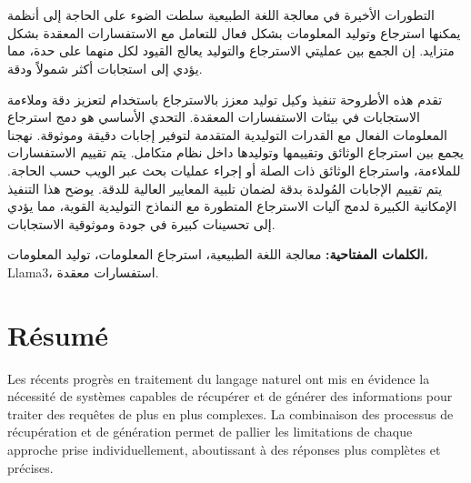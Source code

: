 
\chapter*{}

\begin{RLtext}
    التطورات الأخيرة في معالجة اللغة الطبيعية سلطت الضوء على الحاجة إلى أنظمة يمكنها استرجاع وتوليد المعلومات بشكل فعال للتعامل مع الاستفسارات المعقدة بشكل متزايد. إن الجمع بين عمليتي الاسترجاع والتوليد يعالج القيود لكل منهما على حدة، مما يؤدي إلى استجابات أكثر شمولاً ودقة.

    \hfill

    تقدم هذه الأطروحة تنفيذ وكيل توليد معزز بالاسترجاع  باستخدام  لتعزيز دقة وملاءمة الاستجابات في بيئات الاستفسارات المعقدة. التحدي الأساسي هو دمج استرجاع المعلومات الفعال مع القدرات التوليدية المتقدمة لتوفير إجابات دقيقة وموثوقة. نهجنا يجمع بين استرجاع الوثائق وتقييمها وتوليدها داخل نظام متكامل. يتم تقييم الاستفسارات للملاءمة، واسترجاع الوثائق ذات الصلة أو إجراء عمليات بحث عبر الويب حسب الحاجة. يتم تقييم الإجابات المُولدة بدقة لضمان تلبية المعايير العالية للدقة. يوضح هذا التنفيذ الإمكانية الكبيرة لدمج آليات الاسترجاع المتطورة مع النماذج التوليدية القوية، مما يؤدي إلى تحسينات كبيرة في جودة وموثوقية الاستجابات.

    \hfill

    \noindent\textbf{الكلمات المفتاحية:} معالجة اللغة الطبيعية، استرجاع المعلومات، توليد المعلومات، Llama3، استفسارات معقدة.
\end{RLtext}


\chapter*{Résumé}

Les récents progrès en traitement du langage naturel ont mis en évidence la nécessité de systèmes capables de récupérer et de générer des informations pour traiter des requêtes de plus en plus complexes. La combinaison des processus de récupération et de génération permet de pallier les limitations de chaque approche prise individuellement, aboutissant à des réponses plus complètes et précises.

\hfill

